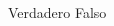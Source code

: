 \begin{multicols}{2}
\begin{parts}
        \begin{oneparcheckboxes}
            \CorrectChoice Verdadero
            \choice Falso
        \end{oneparcheckboxes}













\end{parts}
\end{multicols}
